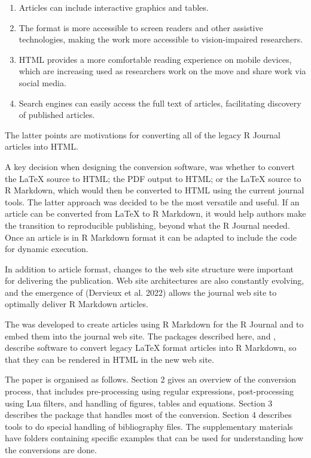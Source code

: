 \begin{enumerate}
\def\labelenumi{\arabic{enumi}.}
\tightlist
\item
  Articles can include interactive graphics and tables.
\item
  The format is more accessible to screen readers and other assistive technologies, making the work more accessible to vision-impaired researchers.
\item
  HTML provides a more comfortable reading experience on mobile devices, which are increasing used as researchers work on the move and share work via social media.
\item
  Search engines can easily access the full text of articles, facilitating discovery of published articles.
\end{enumerate}

The latter points are motivations for converting all of the legacy R Journal articles into HTML.

A key decision when designing the conversion software, was whether to convert the LaTeX source to HTML; the PDF output to HTML; or the LaTeX source to R Markdown, which would then be converted to HTML using the current journal tools. The latter approach was decided to be the most versatile and useful. If an article can be converted from LaTeX to R Markdown, it would help authors make the transition to reproducible publishing, beyond what the R Journal needed. Once an article is in R Markdown format it can be adapted to include the code for dynamic execution.

In addition to article format, changes to the web site structure were important for delivering the publication. Web site architectures are also constantly evolving, and the emergence of  (Dervieux et al. 2022) allows the journal web site to optimally deliver R Markdown articles.

The  was developed to create articles using R Markdown for the R Journal and to embed them into the journal web site. The packages described here,  and , describe software to convert legacy LaTeX format articles into R Markdown, so that they can be rendered in HTML in the new web site.

The paper is organised as follows. Section 2 gives an overview of the conversion process, that includes pre-processing using regular expressions, post-processing using Lua filters, and handling of figures, tables and equations. Section 3 describes the  package that handles most of the conversion. Section 4 describes tools to do special handling of bibliography files. The supplementary materials have folders containing specific examples that can be used for understanding how the conversions are done.

